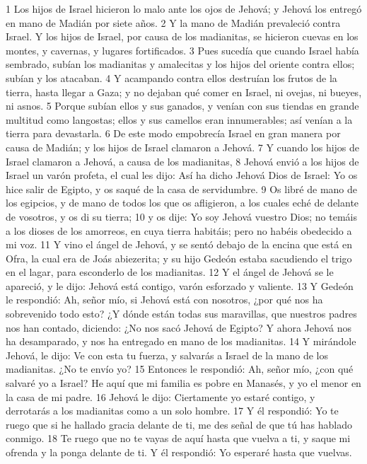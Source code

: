 1 Los hijos de Israel hicieron lo malo ante los ojos de Jehová; y Jehová los entregó en mano de Madián por siete años.
2 Y la mano de Madián prevaleció contra Israel. Y los hijos de Israel, por causa de los madianitas, se hicieron cuevas en los montes, y cavernas, y lugares fortificados.
3 Pues sucedía que cuando Israel había sembrado, subían los madianitas y amalecitas y los hijos del oriente contra ellos; subían y los atacaban.
4 Y acampando contra ellos destruían los frutos de la tierra, hasta llegar a Gaza; y no dejaban qué comer en Israel, ni ovejas, ni bueyes, ni asnos.
5 Porque subían ellos y sus ganados, y venían con sus tiendas en grande multitud como langostas; ellos y sus camellos eran innumerables; así venían a la tierra para devastarla.
6 De este modo empobrecía Israel en gran manera por causa de Madián; y los hijos de Israel clamaron a Jehová.
7 Y cuando los hijos de Israel clamaron a Jehová, a causa de los madianitas,
8 Jehová envió a los hijos de Israel un varón profeta, el cual les dijo: Así ha dicho Jehová Dios de Israel: Yo os hice salir de Egipto, y os saqué de la casa de servidumbre.
9 Os libré de mano de los egipcios, y de mano de todos los que os afligieron, a los cuales eché de delante de vosotros, y os di su tierra;
10 y os dije: Yo soy Jehová vuestro Dios; no temáis a los dioses de los amorreos, en cuya tierra habitáis; pero no habéis obedecido a mi voz.
11 Y vino el ángel de Jehová, y se sentó debajo de la encina que está en Ofra, la cual era de Joás abiezerita; y su hijo Gedeón estaba sacudiendo el trigo en el lagar, para esconderlo de los madianitas.
12 Y el ángel de Jehová se le apareció, y le dijo: Jehová está contigo, varón esforzado y valiente.
13 Y Gedeón le respondió: Ah, señor mío, si Jehová está con nosotros, ¿por qué nos ha sobrevenido todo esto? ¿Y dónde están todas sus maravillas, que nuestros padres nos han contado, diciendo: ¿No nos sacó Jehová de Egipto? Y ahora Jehová nos ha desamparado, y nos ha entregado en mano de los madianitas.
14 Y mirándole Jehová, le dijo: Ve con esta tu fuerza, y salvarás a Israel de la mano de los madianitas. ¿No te envío yo?
15 Entonces le respondió: Ah, señor mío, ¿con qué salvaré yo a Israel? He aquí que mi familia es pobre en Manasés, y yo el menor en la casa de mi padre.
16 Jehová le dijo: Ciertamente yo estaré contigo, y derrotarás a los madianitas como a un solo hombre.
17 Y él respondió: Yo te ruego que si he hallado gracia delante de ti, me des señal de que tú has hablado conmigo.
18 Te ruego que no te vayas de aquí hasta que vuelva a ti, y saque mi ofrenda y la ponga delante de ti. Y él respondió: Yo esperaré hasta que vuelvas.
